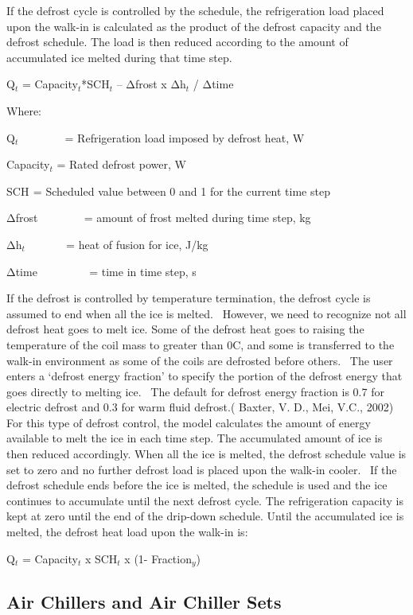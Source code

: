 If the defrost cycle is controlled by the schedule, the refrigeration load placed upon the walk-in is calculated as the product of the defrost capacity and the defrost schedule. The load is then reduced according to the amount of accumulated ice melted during that time step.

Q\(_{t}\) = Capacity\(_{t}\)*SCH\(_{t}\) -- Δfrost x Δh\(_{t}\) / Δtime

Where:

Q\(_{t}\) ~~~~~~~ = Refrigeration load imposed by defrost heat, W

Capacity\(_{t}\) = Rated defrost power, W

SCH\(_{ }\) = Scheduled value between 0 and 1 for the current time step

Δfrost ~~~~~~~ = amount of frost melted during time step, kg

Δh\(_{t}\) ~~~~~~ = heat of fusion for ice, J/kg

Δtime ~~~~~~~~ = time in time step, s

If the defrost is controlled by temperature termination, the defrost cycle is assumed to end when all the ice is melted.~ However, we need to recognize not all defrost heat goes to melt ice. Some of the defrost heat goes to raising the temperature of the coil mass to greater than 0C, and some is transferred to the walk-in environment as some of the coils are defrosted before others.~ The user enters a `defrost energy fraction' to specify the portion of the defrost energy that goes directly to melting ice.~ The default for defrost energy fraction is 0.7 for electric defrost and 0.3 for warm fluid defrost.( Baxter, V. D., Mei, V.C., 2002) For this type of defrost control, the model calculates the amount of energy available to melt the ice in each time step. The accumulated amount of ice is then reduced accordingly. When all the ice is melted, the defrost schedule value is set to zero and no further defrost load is placed upon the walk-in cooler.~ If the defrost schedule ends before the ice is melted, the schedule is used and the ice continues to accumulate until the next defrost cycle. The refrigeration capacity is kept at zero until the end of the drip-down schedule. Until the accumulated ice is melted, the defrost heat load upon the walk-in is:

Q\(_{t}\) = Capacity\(_{t}\) x SCH\(_{t}\) x (1- Fraction\(_{y}\))

\subsection{Air Chillers and Air Chiller Sets}\label{air-chillers-and-air-chiller-sets}

